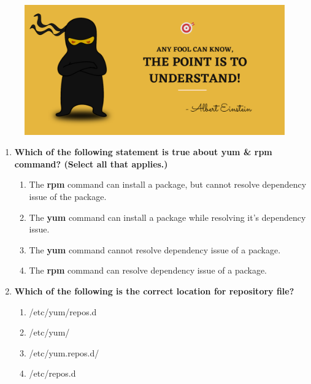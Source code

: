 \setlength{\columnsep}{3pt}
\begin{flushleft}
	
	\paragraph{}
	\bigskip
	
	\begin{figure}[h!]
		\centering
		\includegraphics[scale=.2]{content/practise.jpg}
	\end{figure}	
	\begin{enumerate}
		
		\item \textbf{Which of the following statement is true about yum \& rpm command? (Select all that applies.)}
		\begin{enumerate}[label=(\alph*)]
			\item The \textbf{rpm} command can install a package, but cannot resolve dependency issue of the package. %
			\item The \textbf{yum} command can install a package while resolving it's dependency issue. %
			\item The \textbf{yum} command cannot resolve dependency issue of a package.
			\item The \textbf{rpm} command can resolve dependency issue of a package.
		\end{enumerate}
		\bigskip
		\bigskip
		
		\item \textbf{Which of the following is the correct location for repository file?}
		\begin{enumerate}[label=(\alph*)]
			\item /etc/yum/repos.d
			\item /etc/yum/
			\item /etc/yum.repos.d/  %
			\item /etc/repos.d
		\end{enumerate}
		\bigskip
		\bigskip	
		

\end{enumerate}
\end{flushleft}

